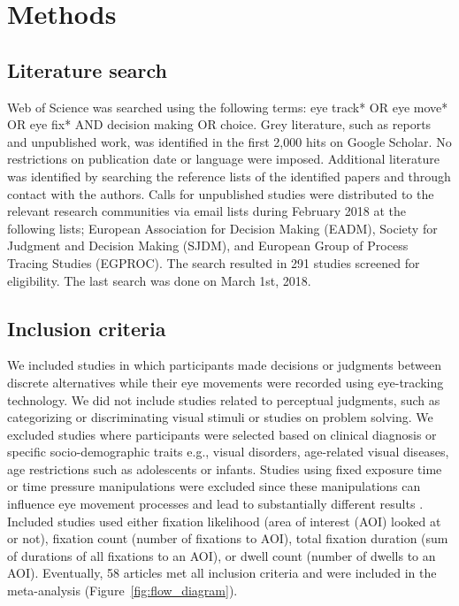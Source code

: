 
\section{Methods}

\subsection{Literature search}

Web of Science was searched using the following terms: eye track* OR eye move* OR eye fix* AND decision making OR choice. Grey literature, such as reports and unpublished work, was identified in the first 2,000 hits on Google Scholar. No restrictions on publication date or language were imposed. Additional literature was identified by searching the reference lists of the identified papers and through contact with the authors. Calls for unpublished studies were distributed to the relevant research communities via email lists during February 2018 at the following lists; European Association for Decision Making (EADM), Society for Judgment and Decision Making (SJDM), and European Group of Process Tracing Studies (EGPROC). The search resulted in 291 studies screened for eligibility. The last search was done on March 1st, 2018.


\subsection{Inclusion criteria}

We included studies in which participants made decisions or judgments between discrete alternatives while their eye movements were recorded using eye-tracking technology. We did not include studies related to perceptual judgments, such as categorizing or discriminating visual stimuli or studies on problem solving. We excluded studies where participants were selected based on clinical diagnosis or specific socio-demographic traits e.g., visual disorders, age-related visual diseases, age restrictions such as adolescents or infants. Studies using fixed exposure time or time pressure manipulations were excluded since these manipulations can influence eye movement processes \citep{orquin2018a} and lead to substantially different results \citep{simola2019a}. Included studies used either fixation likelihood (area of interest (AOI) looked at or not), fixation count (number of fixations to AOI), total fixation duration (sum of durations of all fixations to an AOI), or dwell count (number of dwells to an AOI). Eventually, 58 articles met all inclusion criteria and were included in the meta-analysis (Figure~\ref{fig:flow_diagram}).


